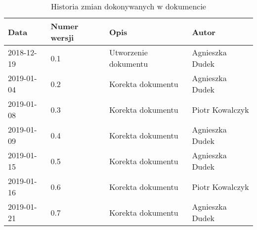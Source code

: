 \documentclass{article}
\begin{document}
\begin{titlepage}






\end{titlepage}

\addtocounter{page}{1}
\newpage

\begin{table}[h!]
	\begin{center}
		\caption{Historia zmian dokonywanych w dokumencie}
		\begin{tabular}{|l|l|l|l|}
			\hline
			Data & Numer wersji & Opis & Autor \\
			\hline \hline
			2018-12-19 & 0.1 & Utworzenie dokumentu & Agnieszka Dudek \\
			\hline
			2019-01-04 & 0.2 & Korekta dokumentu & Agnieszka Dudek \\
			\hline
			2019-01-08 & 0.3 & Korekta dokumentu & Piotr Kowalczyk \\
			\hline 
			2019-01-09 & 0.4 & Korekta dokumentu & Agnieszka Dudek \\
			\hline 
			2019-01-15 & 0.5 & Korekta dokumentu & Agnieszka Dudek \\
			\hline 
			2019-01-16 & 0.6 & Korekta dokumentu & Piotr Kowalczyk \\
			\hline 
			2019-01-21 & 0.7 & Korekta dokumentu & Agnieszka Dudek \\
			\hline 


    \end{tabular}
	\end{center}
\end{table}	
\end{document}
